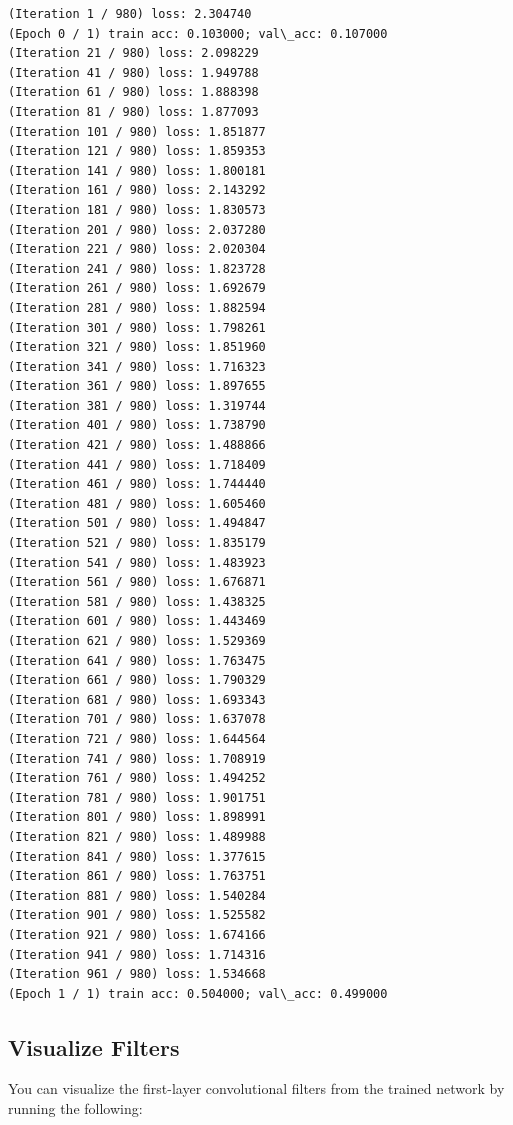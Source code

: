 \documentclass[11pt]{article}
\begin{document}
    \begin{Verbatim}[commandchars=\\\{\}]
(Iteration 1 / 980) loss: 2.304740
(Epoch 0 / 1) train acc: 0.103000; val\_acc: 0.107000
(Iteration 21 / 980) loss: 2.098229
(Iteration 41 / 980) loss: 1.949788
(Iteration 61 / 980) loss: 1.888398
(Iteration 81 / 980) loss: 1.877093
(Iteration 101 / 980) loss: 1.851877
(Iteration 121 / 980) loss: 1.859353
(Iteration 141 / 980) loss: 1.800181
(Iteration 161 / 980) loss: 2.143292
(Iteration 181 / 980) loss: 1.830573
(Iteration 201 / 980) loss: 2.037280
(Iteration 221 / 980) loss: 2.020304
(Iteration 241 / 980) loss: 1.823728
(Iteration 261 / 980) loss: 1.692679
(Iteration 281 / 980) loss: 1.882594
(Iteration 301 / 980) loss: 1.798261
(Iteration 321 / 980) loss: 1.851960
(Iteration 341 / 980) loss: 1.716323
(Iteration 361 / 980) loss: 1.897655
(Iteration 381 / 980) loss: 1.319744
(Iteration 401 / 980) loss: 1.738790
(Iteration 421 / 980) loss: 1.488866
(Iteration 441 / 980) loss: 1.718409
(Iteration 461 / 980) loss: 1.744440
(Iteration 481 / 980) loss: 1.605460
(Iteration 501 / 980) loss: 1.494847
(Iteration 521 / 980) loss: 1.835179
(Iteration 541 / 980) loss: 1.483923
(Iteration 561 / 980) loss: 1.676871
(Iteration 581 / 980) loss: 1.438325
(Iteration 601 / 980) loss: 1.443469
(Iteration 621 / 980) loss: 1.529369
(Iteration 641 / 980) loss: 1.763475
(Iteration 661 / 980) loss: 1.790329
(Iteration 681 / 980) loss: 1.693343
(Iteration 701 / 980) loss: 1.637078
(Iteration 721 / 980) loss: 1.644564
(Iteration 741 / 980) loss: 1.708919
(Iteration 761 / 980) loss: 1.494252
(Iteration 781 / 980) loss: 1.901751
(Iteration 801 / 980) loss: 1.898991
(Iteration 821 / 980) loss: 1.489988
(Iteration 841 / 980) loss: 1.377615
(Iteration 861 / 980) loss: 1.763751
(Iteration 881 / 980) loss: 1.540284
(Iteration 901 / 980) loss: 1.525582
(Iteration 921 / 980) loss: 1.674166
(Iteration 941 / 980) loss: 1.714316
(Iteration 961 / 980) loss: 1.534668
(Epoch 1 / 1) train acc: 0.504000; val\_acc: 0.499000

    \end{Verbatim}

    \subsection{Visualize Filters}\label{visualize-filters}

You can visualize the first-layer convolutional filters from the trained
network by running the following:
\end{document}
